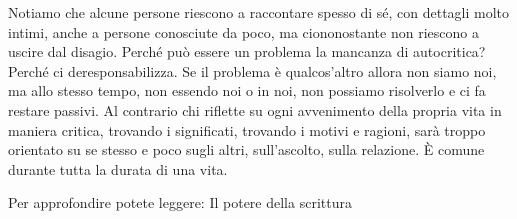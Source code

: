 \documentclass[12pt]{book} %
\begin{document}
Notiamo che alcune persone riescono a raccontare spesso di sé, con dettagli molto intimi, anche a persone conosciute da
poco, ma ciononostante non riescono a uscire dal disagio. Perché può essere un problema la mancanza di autocritica?
Perché ci deresponsabilizza. Se il problema è qualcos'altro allora non siamo noi, ma allo stesso
tempo, non essendo noi o in noi, non possiamo risolverlo e ci fa restare passivi. Al contrario chi riflette su ogni
avvenimento della propria vita in maniera critica, trovando i significati, trovando i motivi e ragioni, sarà troppo
orientato su se stesso e poco sugli altri, sull'ascolto, sulla relazione. È comune durante tutta la durata di una vita.

Per approfondire potete leggere: Il potere della
scrittura


\bigskip


\bigskip
\end{document}
